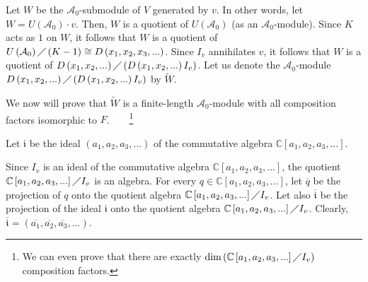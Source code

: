 \documentclass[etingof-lie.tex]{subfiles}
\begin{document}
Let $W$ be the $\mathcal{A}_{0}$-submodule of $V$ generated by $v$. In other
words, let $W=U\left(  \mathcal{A}_{0}\right)  \cdot v$. Then, $W$ is a
quotient of $U\left(  \mathcal{A}_{0}\right)  $ (as an $\mathcal{A}_{0}%
$-module). Since $K$ acts as $1$ on $W$, it follows that $W$ is a quotient of
$U\left(  \mathcal{A}_{0}\right)  \diagup\left(  K-1\right)  \cong D\left(
x_{1},x_{2},x_{3},...\right)  $. Since $I_{v}$ annihilates $v$, it follows
that $W$ is a quotient of $D\left(  x_{1},x_{2},...\right)  \diagup\left(
D\left(  x_{1},x_{2},...\right)  I_{v}\right)  $. Let us denote the
$\mathcal{A}_{0}$-module $D\left(  x_{1},x_{2},...\right)  \diagup\left(
D\left(  x_{1},x_{2},...\right)  I_{v}\right)  $ by $\widetilde{W}$.

We now will prove that $\widetilde{W}$ is a finite-length $\mathcal{A}_{0}%
$-module with all composition factors isomorphic to $F$.\ \ \ \ \footnote{We
can even prove that there are exactly $\dim\left(  \mathbb{C}\left[
a_{1},a_{2},a_{3},...\right]  \diagup I_{v}\right)  $ composition factors.}

Let $\mathfrak{i}$ be the ideal $\left(  a_{1},a_{2},a_{3},...\right)  $ of
the commutative algebra $\mathbb{C}\left[  a_{1},a_{2},a_{3},...\right]  $.

Since $I_{v}$ is an ideal of the commutative algebra $\mathbb{C}\left[
a_{1},a_{2},a_{3},...\right]  $, the quotient $\mathbb{C}\left[  a_{1}%
,a_{2},a_{3},...\right]  \diagup I_{v}$ is an algebra. For every
$q\in\mathbb{C}\left[  a_{1},a_{2},a_{3},...\right]  $, let $\overline{q}$ be
the projection of $q$ onto the quotient algebra $\mathbb{C}\left[  a_{1}%
,a_{2},a_{3},...\right]  \diagup I_{v}$. Let also $\overline{\mathfrak{i}}$ be
the projection of the ideal $\mathfrak{i}$ onto the quotient algebra
$\mathbb{C}\left[  a_{1},a_{2},a_{3},...\right]  \diagup I_{v}$. Clearly,
$\overline{\mathfrak{i}}=\left(  \overline{a_{1}},\overline{a_{2}}%
,\overline{a_{3}},...\right)  $.
\end{document}
